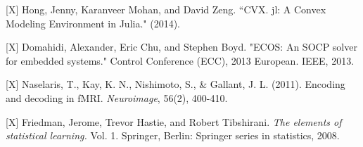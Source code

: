 \documentclass{article}
\begin{document}
[X] Hong, Jenny, Karanveer Mohan, and David Zeng. ``CVX. jl: A Convex Modeling Environment in Julia." (2014).

[X] Domahidi, Alexander, Eric Chu, and Stephen Boyd. "ECOS: An SOCP solver for embedded systems." Control Conference (ECC), 2013 European. IEEE, 2013.

[X] Naselaris, T., Kay, K. N., Nishimoto, S., \& Gallant,
J. L. (2011). Encoding and decoding in fMRI. \emph{Neuroimage}, 56(2),
400-410.

[X] Friedman, Jerome, Trevor Hastie, and Robert Tibshirani. \emph{The elements
of statistical learning.} Vol. 1. Springer, Berlin: Springer series in
statistics, 2008.
\end{document}
